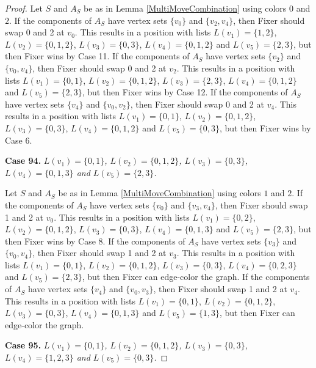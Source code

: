 \documentclass[12pt]{amsart}
\theoremstyle{plain}
\theoremstyle{definition}
\theoremstyle{remark}
\begin{document}
\begin{proof}
Let $S$ and $A_S$ be as in Lemma \ref{MultiMoveCombination} using colors $0$ and $2$. If the components of $A_S$ have vertex sets $\{v_0\}$ and $\{v_2, v_4\}$, then Fixer should swap 0 and 2 at $v_0$. This results in a position with lists $L(v_1) = \{1, 2\}$, $L(v_2) = \{0, 1, 2\}$, $L(v_3) = \{0, 3\}$, $L(v_4) = \{0, 1, 2\}$ and $L(v_5) = \{2, 3\}$, but then Fixer wins by Case 11.
If the components of $A_S$ have vertex sets $\{v_2\}$ and $\{v_0, v_4\}$, then Fixer should swap 0 and 2 at $v_2$. This results in a position with lists $L(v_1) = \{0, 1\}$, $L(v_2) = \{0, 1, 2\}$, $L(v_3) = \{2, 3\}$, $L(v_4) = \{0, 1, 2\}$ and $L(v_5) = \{2, 3\}$, but then Fixer wins by Case 12.
If the components of $A_S$ have vertex sets $\{v_4\}$ and $\{v_0, v_2\}$, then Fixer should swap 0 and 2 at $v_4$. This results in a position with lists $L(v_1) = \{0, 1\}$, $L(v_2) = \{0, 1, 2\}$, $L(v_3) = \{0, 3\}$, $L(v_4) = \{0, 1, 2\}$ and $L(v_5) = \{0, 3\}$, but then Fixer wins by Case 6.

\noindent\textbf{Case 94.  }\textit{$L(v_1) = \{0, 1\}$, $L(v_2) = \{0, 1, 2\}$, $L(v_3) = \{0, 3\}$, $L(v_4) = \{0, 1, 3\}$ and $L(v_5) = \{2, 3\}$.}

Let $S$ and $A_S$ be as in Lemma \ref{MultiMoveCombination} using colors $1$ and $2$. If the components of $A_S$ have vertex sets $\{v_0\}$ and $\{v_3, v_4\}$, then Fixer should swap 1 and 2 at $v_0$. This results in a position with lists $L(v_1) = \{0, 2\}$, $L(v_2) = \{0, 1, 2\}$, $L(v_3) = \{0, 3\}$, $L(v_4) = \{0, 1, 3\}$ and $L(v_5) = \{2, 3\}$, but then Fixer wins by Case 8.
If the components of $A_S$ have vertex sets $\{v_3\}$ and $\{v_0, v_4\}$, then Fixer should swap 1 and 2 at $v_3$. This results in a position with lists $L(v_1) = \{0, 1\}$, $L(v_2) = \{0, 1, 2\}$, $L(v_3) = \{0, 3\}$, $L(v_4) = \{0, 2, 3\}$ and $L(v_5) = \{2, 3\}$, but then Fixer can edge-color the graph.
If the components of $A_S$ have vertex sets $\{v_4\}$ and $\{v_0, v_3\}$, then Fixer should swap 1 and 2 at $v_4$. This results in a position with lists $L(v_1) = \{0, 1\}$, $L(v_2) = \{0, 1, 2\}$, $L(v_3) = \{0, 3\}$, $L(v_4) = \{0, 1, 3\}$ and $L(v_5) = \{1, 3\}$, but then Fixer can edge-color the graph.

\noindent\textbf{Case 95.  }\textit{$L(v_1) = \{0, 1\}$, $L(v_2) = \{0, 1, 2\}$, $L(v_3) = \{0, 3\}$, $L(v_4) = \{1, 2, 3\}$ and $L(v_5) = \{0, 3\}$.}


\end{proof}
\end{document}
